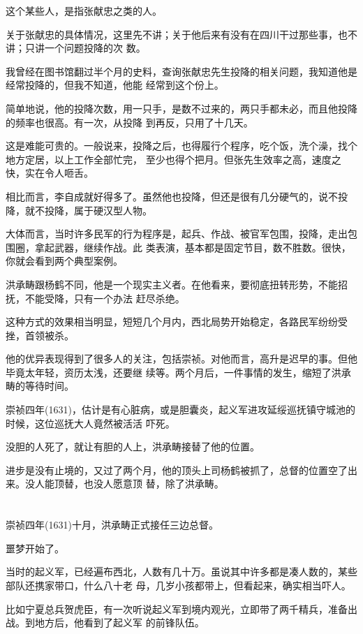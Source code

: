 \documentclass[11pt,a4paper,onecolumn]{article}
\begin{document}
这个某些人，是指张献忠之类的人。

关于张献忠的具体情况，这里先不讲；关于他后来有没有在四川干过那些事，也不讲；只讲一个问题\myrule 投降的次
数。

我曾经在图书馆翻过半个月的史料，查询张献忠先生投降的相关问题，我知道他是经常投降的，但我不知道，他能
经常到这个份上。

简单地说，他的投降次数，用一只手，是数不过来的，两只手都未必，而且他投降的频率也很高。有一次，从投降
到再反，只用了十几天。

这是难能可贵的。一般说来，投降之后，也得履行个程序，吃个饭，洗个澡，找个地方定居，以上工作全部忙完，
至少也得个把月。但张先生效率之高，速度之快，实在令人咂舌。

相比而言，李自成就好得多了。虽然他也投降，但还是很有几分硬气的，说不投降，就不投降，属于硬汉型人物。

大体而言，当时许多民军的行为程序是，起兵、作战、被官军包围，投降，走出包围圈，拿起武器，继续作战。此
类表演，基本都是固定节目，数不胜数。很快，你就会看到两个典型案例。

洪承畴跟杨鹤不同，他是一个现实主义者。在他看来，要彻底扭转形势，不能招抚，不能受降，只有一个办法\myrule 
赶尽杀绝。

这种方式的效果相当明显，短短几个月内，西北局势开始稳定，各路民军纷纷受挫，首领被杀。

他的优异表现得到了很多人的关注，包括崇祯。对他而言，高升是迟早的事。但他毕竟太年轻，资历太浅，还要继
续等。两个月后，一件事情的发生，缩短了洪承畴的等待时间。

崇祯四年(1631)，估计是有心脏病，或是胆囊炎，起义军进攻延绥巡抚镇守城池的时候，这位巡抚大人竟然被活活
吓死。

没胆的人死了，就让有胆的人上，洪承畴接替了他的位置。

进步是没有止境的，又过了两个月，他的顶头上司杨鹤被抓了，总督的位置空了出来。没人能顶替，也没人愿意顶
替，除了洪承畴。

\section[\thesection]{}

崇祯四年(1631)十月，洪承畴正式接任三边总督。

噩梦开始了。

当时的起义军，已经遍布西北，人数有几十万。虽说其中许多都是凑人数的，某些部队还携家带口，什么八十老
母，几岁小孩都带上，但看起来，确实相当吓人。

比如宁夏总兵贺虎臣，有一次听说起义军到境内观光，立即带了两千精兵，准备出战。到地方后，他看到了起义军
的前锋队伍。
\end{document}
